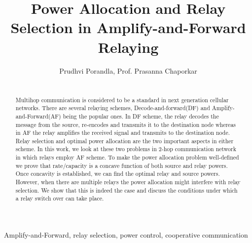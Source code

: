 \documentclass{absconf}
\begin{document}
 \begin{frontmatter}

	\title{Power Allocation and Relay Selection in Amplify-and-Forward
	Relaying}

	\author{Prudhvi Porandla, Prof. Prasanna Chaporkar} \address{ Electrical
	Engineering, IIT Bombay   } 
	\vspace{12pt} 
	\begin{abstract}
		 \mbox{} \\ 
		 Multihop
		communication is considered to be a standard in next generation
		cellular networks.  There are several relaying schemes,
		Decode-and-forward(DF) and Amplify-and-Forward(AF) being the popular
		ones. In DF scheme, the relay decodes the message from the source,
		re-encodes and transmits it to the destination node whereas in AF
		the relay amplifies the received signal and transmits to the
		destination node. Relay selection and optimal power allocation are
		the two important aspects in either scheme. In this work, we look at
		these two problems in 2-hop communication network in which relays
		employ AF scheme. To make the power allocation problem well-defined
		we prove that rate/capacity is a concave function of both source and
		relay powers. Once concavity is established, we can find the optimal
		relay and source powers. However, when there are multiple relays the power allocation might interfere with relay selection. We show that this is indeed the case and discuss the conditions under which a relay switch over can take place.  

	\end{abstract}

\begin{keyword} 
	Amplify-and-Forward, relay selection, power control, cooperative communication
\end{keyword}

\end{frontmatter}
\end{document}
